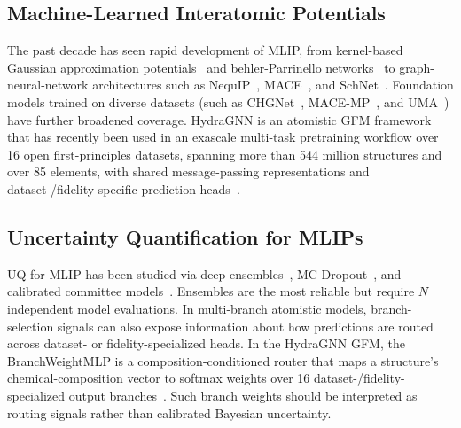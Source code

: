 \documentclass[conference]{IEEEtran}
\def\ac#1{#1}%
\def\acp#1{#1}%
\begin{document}
\subsection{Machine-Learned Interatomic Potentials}
The past decade has seen rapid development of \acp{MLIP}, from kernel-based
Gaussian approximation potentials~\cite{bartok2010} and behler-Parrinello
networks~\cite{behler2007} to graph-neural-network architectures such as
NequIP~\cite{batzner2022}, MACE~\cite{batatia2022}, and
SchNet~\cite{schutt2018}. Foundation models trained on diverse datasets
(such as CHGNet~\cite{deng2023}, MACE-MP~\cite{batatia2023macemp}, and
UMA~\cite{uma2024}) have further broadened coverage. HydraGNN is an atomistic \ac{GFM} framework that has recently been used
in an exascale multi-task pretraining workflow over 16 open first-principles
datasets, spanning more than 544 million structures and over 85 elements, with
shared message-passing representations and dataset-/fidelity-specific
prediction heads~\cite{hydragnn,lupopasini2026exascalegfm}.

\subsection{Uncertainty Quantification for MLIPs}
\ac{UQ} for \acp{MLIP} has been studied via deep ensembles~\cite{lakshminarayanan2017},
\ac{MC}-Dropout~\cite{gal2016}, and calibrated committee models~\cite{schran2020}.
Ensembles are the most reliable but require $N$ independent model evaluations.
In multi-branch atomistic models, branch-selection signals can also expose
information about how predictions are routed across dataset- or
fidelity-specialized heads. In the HydraGNN \ac{GFM}, the BranchWeightMLP is a
composition-conditioned router that maps a structure's chemical-composition
vector to softmax weights over 16 dataset-/fidelity-specialized output
branches~\cite{lupopasini2026exascalegfm}. Such branch weights should be
interpreted as routing signals rather than calibrated Bayesian uncertainty.
\end{document}
